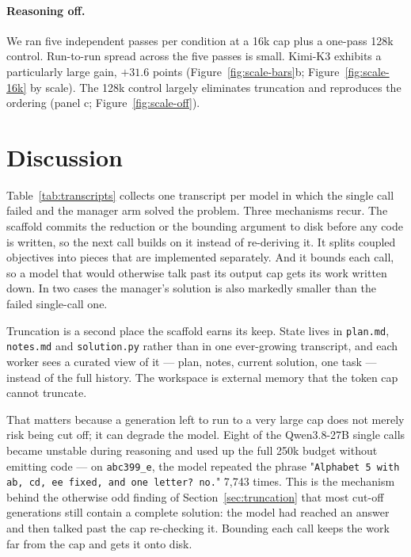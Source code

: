 \documentclass{article}
\begin{document}
\paragraph{Reasoning off.} We ran five independent
passes per condition at a 16k cap plus a one-pass 128k control. Run-to-run spread across the
five passes is small. Kimi-K3 exhibits a particularly large gain, $+31.6$ points
(Figure~\ref{fig:scale-bars}b; Figure~\ref{fig:scale-16k} by scale). The 128k control largely
eliminates truncation and reproduces the ordering (panel c; Figure~\ref{fig:scale-off}).

\section{Discussion}
\label{sec:discussion}

Table~\ref{tab:transcripts} collects one transcript per model in which the single call failed
and the manager arm solved the problem. Three mechanisms recur. The scaffold commits the
reduction or the bounding argument to disk before any code is written, so the next call builds
on it instead of re-deriving it. It splits coupled objectives into pieces that are implemented
separately. And it bounds each call, so a model that would otherwise talk past its output cap
gets its work written down. In two cases the manager's solution is also markedly smaller than
the failed single-call one.

Truncation is a second place the scaffold earns its keep. State lives in \texttt{plan.md},
\texttt{notes.md} and \texttt{solution.py} rather than in one ever-growing transcript, and
each worker sees a curated view of it --- plan, notes, current solution, one task --- instead
of the full history. The workspace is external memory that the token cap cannot truncate.

That matters because a generation left to run to a very large cap does not merely risk being
cut off; it can degrade the model. Eight of the Qwen3.8-27B single calls became unstable during reasoning and
used up the full 250k budget without emitting code --- on \texttt{abc399\_e},
the model repeated the phrase "\texttt{Alphabet 5 with ab, cd, ee fixed, and one letter? no.}" 7{,}743 times.
This is the mechanism behind the otherwise odd finding of Section~\ref{sec:truncation} that most
cut-off generations still contain a complete solution: the model had reached an answer and
then talked past the cap re-checking it. Bounding each call keeps the work far from the cap and
gets it onto disk.
\end{document}
